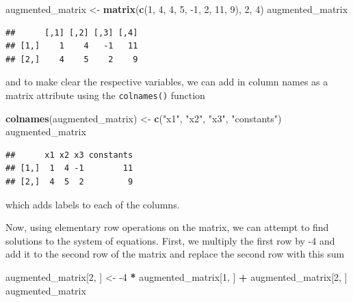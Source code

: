 \documentclass[
]{book}
\newenvironment{Shaded}{\begin{snugshade}}{\end{snugshade}}
\newcommand{\DecValTok}[1]{\textcolor[rgb]{0.00,0.00,0.81}{#1}}
\newcommand{\KeywordTok}[1]{\textcolor[rgb]{0.13,0.29,0.53}{\textbf{#1}}}
\newcommand{\NormalTok}[1]{#1}
\newcommand{\OperatorTok}[1]{\textcolor[rgb]{0.81,0.36,0.00}{\textbf{#1}}}
\newcommand{\StringTok}[1]{\textcolor[rgb]{0.31,0.60,0.02}{#1}}
\theoremstyle{definition}
\theoremstyle{definition}
\theoremstyle{definition}
\theoremstyle{remark}
\begin{document}
\begin{Shaded}
\begin{Highlighting}[]
\NormalTok{augmented_matrix <-}\StringTok{ }\KeywordTok{matrix}\NormalTok{(}\KeywordTok{c}\NormalTok{(}\DecValTok{1}\NormalTok{, }\DecValTok{4}\NormalTok{, }\DecValTok{4}\NormalTok{, }\DecValTok{5}\NormalTok{, }\DecValTok{-1}\NormalTok{, }\DecValTok{2}\NormalTok{, }\DecValTok{11}\NormalTok{, }\DecValTok{9}\NormalTok{), }\DecValTok{2}\NormalTok{, }\DecValTok{4}\NormalTok{)}
\NormalTok{augmented_matrix}
\end{Highlighting}
\end{Shaded}

\begin{verbatim}
##      [,1] [,2] [,3] [,4]
## [1,]    1    4   -1   11
## [2,]    4    5    2    9
\end{verbatim}

and to make clear the respective variables, we can add in column names as a matrix attribute using the \texttt{colnames()} function

\begin{Shaded}
\begin{Highlighting}[]
\KeywordTok{colnames}\NormalTok{(augmented_matrix) <-}\StringTok{ }\KeywordTok{c}\NormalTok{(}\StringTok{"x1"}\NormalTok{, }\StringTok{"x2"}\NormalTok{, }\StringTok{"x3"}\NormalTok{, }\StringTok{"constants"}\NormalTok{)}
\NormalTok{augmented_matrix}
\end{Highlighting}
\end{Shaded}

\begin{verbatim}
##      x1 x2 x3 constants
## [1,]  1  4 -1        11
## [2,]  4  5  2         9
\end{verbatim}

which adds labels to each of the columns.

Now, using elementary row operations on the matrix, we can attempt to find solutions to the system of equations. First, we multiply the first row by -4 and add it to the second row of the matrix and replace the second row with this sum

\begin{Shaded}
\begin{Highlighting}[]
\NormalTok{augmented_matrix[}\DecValTok{2}\NormalTok{, ] <-}\StringTok{ }\DecValTok{-4} \OperatorTok{*}\StringTok{ }\NormalTok{augmented_matrix[}\DecValTok{1}\NormalTok{, ] }\OperatorTok{+}\StringTok{ }\NormalTok{augmented_matrix[}\DecValTok{2}\NormalTok{, ]}
\NormalTok{augmented_matrix}
\end{Highlighting}
\end{Shaded}
\end{document}

